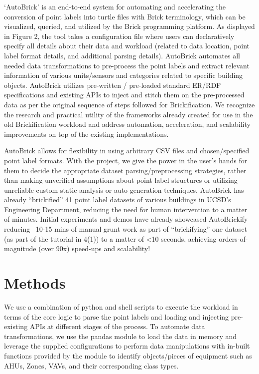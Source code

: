 \documentclass[twocolumn, switch]{article} %
\begin{document}
‘AutoBrick’ is an end-to-end system for automating and accelerating the conversion of point labels into turtle files with Brick terminology, which can be visualized, queried, and utilized by the Brick programming platform. As displayed in Figure 2, the tool takes a configuration file where users can declaratively specify all details about their data and workload (related to data location, point label format details, and additional parsing details). AutoBrick automates all needed data transformations to pre-process the point labels and extract relevant information of various units/sensors and categories related to specific building objects. AutoBrick utilizes pre-written / pre-loaded standard ER/RDF specifications and existing APIs to inject and stitch them on the pre-processed data as per the original sequence of steps followed for Brickification. We recognize the research and practical utility of the frameworks already created for use in the old Brickification workload and address automation, acceleration, and scalability improvements on top of the existing implementations. 

	AutoBrick allows for flexibility in using arbitrary CSV files and chosen/specified point label formats. With the project, we give the power in the user’s hands for them to decide the appropriate dataset parsing/preprocessing strategies, rather than making unverified assumptions about point label structures or utilizing unreliable custom static analysis or auto-generation techniques. AutoBrick has already “brickified” 41 point label datasets of various buildings in UCSD’s Engineering Department, reducing the need for human intervention to a matter of minutes. Initial experiments and demos have already showcased AutoBrickify reducing ~10-15 mins of manual grunt work as part of “brickifying” one dataset (as part of the tutorial in 4(1)) to a matter of <10 seconds, achieving orders-of-magnitude (over 90x) speed-ups and scalability!

\section{Methods}
We use a combination of python and shell scripts to execute the workload in terms of the core logic to parse the point labels and loading and injecting pre-existing APIs at different stages of the process.  
To automate data transformations, we use the pandas module to load the data in memory and leverage the supplied configurations to perform data manipulations with in-built functions provided by the module to identify objects/pieces of equipment such as AHUs, Zones, VAVs, and their corresponding class types. 
\end{document}
